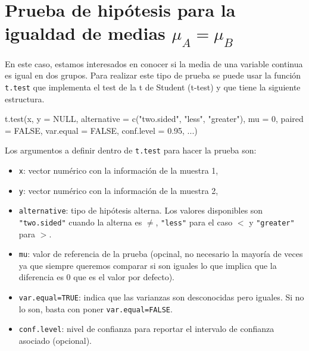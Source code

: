 \documentclass[
]{book}
\newenvironment{Shaded}{\begin{snugshade}}{\end{snugshade}}
\newcommand{\AttributeTok}[1]{\textcolor[rgb]{0.77,0.63,0.00}{#1}}
\newcommand{\ConstantTok}[1]{\textcolor[rgb]{0.00,0.00,0.00}{#1}}
\newcommand{\DecValTok}[1]{\textcolor[rgb]{0.00,0.00,0.81}{#1}}
\newcommand{\FloatTok}[1]{\textcolor[rgb]{0.00,0.00,0.81}{#1}}
\newcommand{\FunctionTok}[1]{\textcolor[rgb]{0.00,0.00,0.00}{#1}}
\newcommand{\NormalTok}[1]{#1}
\newcommand{\StringTok}[1]{\textcolor[rgb]{0.31,0.60,0.02}{#1}}
\providecommand{\tightlist}{%
  \setlength{\itemsep}{0pt}\setlength{\parskip}{0pt}}
\begin{document}
\hypertarget{prueba-de-hipuxf3tesis-para-la-igualdad-de-medias-mu_a-mu_b}{%
\section{\texorpdfstring{Prueba de hipótesis para la igualdad de medias \(\mu_A = \mu_B\)}{Prueba de hipótesis para la igualdad de medias \textbackslash mu\_A = \textbackslash mu\_B}}\label{prueba-de-hipuxf3tesis-para-la-igualdad-de-medias-mu_a-mu_b}}

En este caso, estamos interesados en conocer si la media de una variable continua es igual en dos grupos. Para realizar este tipo de prueba se puede usar la función \texttt{t.test} que implementa el test de la t de Student (t-test) y que tiene la siguiente estructura.

\begin{Shaded}
\begin{Highlighting}[]
\FunctionTok{t.test}\NormalTok{(x, }\AttributeTok{y =} \ConstantTok{NULL}\NormalTok{,}
       \AttributeTok{alternative =} \FunctionTok{c}\NormalTok{(}\StringTok{"two.sided"}\NormalTok{, }\StringTok{"less"}\NormalTok{, }\StringTok{"greater"}\NormalTok{),}
       \AttributeTok{mu =} \DecValTok{0}\NormalTok{, }\AttributeTok{paired =} \ConstantTok{FALSE}\NormalTok{, }\AttributeTok{var.equal =} \ConstantTok{FALSE}\NormalTok{,}
       \AttributeTok{conf.level =} \FloatTok{0.95}\NormalTok{, ...)}
\end{Highlighting}
\end{Shaded}

Los argumentos a definir dentro de \texttt{t.test} para hacer la prueba son:

\begin{itemize}
\tightlist
\item
  \texttt{x}: vector numérico con la información de la muestra 1,
\item
  \texttt{y}: vector numérico con la información de la muestra 2,
\item
  \texttt{alternative}: tipo de hipótesis alterna. Los valores disponibles son \texttt{"two.sided"} cuando la alterna es \(\neq\), \texttt{"less"} para el caso \(<\) y \texttt{"greater"} para \(>\).
\item
  \texttt{mu}: valor de referencia de la prueba (opcinal, no necesario la mayoría de veces ya que siempre queremos comparar si son iguales lo que implica que la diferencia es 0 que es el valor por defecto).
\item
  \texttt{var.equal=TRUE}: indica que las varianzas son desconocidas pero iguales. Si no lo son, basta con poner \texttt{var.equal=FALSE}.
\item
  \texttt{conf.level}: nivel de confianza para reportar el intervalo de confianza asociado (opcional).
\end{itemize}
\end{document}
